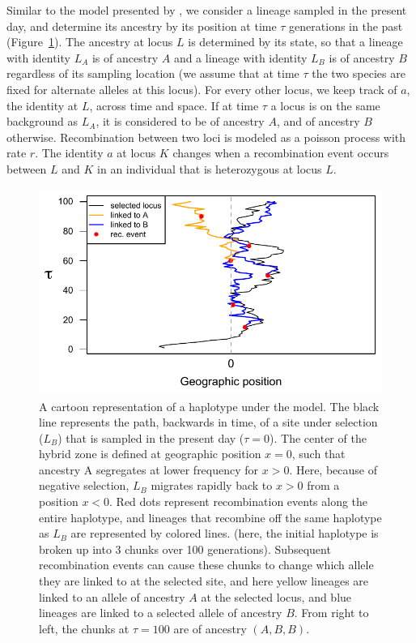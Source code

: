 \documentclass[12pt]{article}
\begin{document}
Similar to the model presented by \cite{Sedghifar2015}, we consider a lineage sampled in the present day, and determine its ancestry by its position at time $\tau$ generations in the past (Figure~\ref{Fig:schematic}). 
The ancestry at locus $L$ is determined by its state, so that a lineage with identity $L_A$ is of ancestry $A$ and a lineage with identity $L_B$ is of ancestry $B$ regardless of its sampling location (we assume that at time $\tau$ the two species are fixed for alternate alleles at this locus). 
For every other locus, we keep track of $a$, the identity at $L$, across time and space. If at time $\tau$ a locus is on the same background as $L_A$, it is considered to be of ancestry $A$, and of ancestry $B$ otherwise. Recombination between two loci is modeled as a poisson process with rate $r$. The identity $a$ at locus $K$ changes when a recombination event occurs between $L$ and $K$ in an individual that is heterozygous at locus $L$. 

\begin{figure}
\includegraphics{figs/BM_schematic}
\caption{A cartoon representation of a haplotype under the model. The black line represents the path, backwards in time, of a site under selection ($L_B$) that is sampled in the present day ($\tau=0$). The center of the hybrid zone is defined at geographic position $x=0$, such that ancestry A segregates at lower frequency for $x>0$. Here, because of negative selection, $L_B$ migrates rapidly back to $x>0$ from a position $x<0$. Red dots represent recombination events along the entire haplotype, and lineages that recombine off the same haplotype as $L_B$ are represented by colored lines. (here, the initial haplotype is broken up into 3 chunks over 100 generations). Subsequent recombination events can cause these chunks to change which allele they are linked to at the selected site, and here yellow lineages are linked to an allele of ancestry $A$ at the selected locus, and blue lineages are linked to a selected allele of ancestry $B$. From right to left, the chunks at $\tau=100$ are of ancestry $(A, B, B)$. }\label{Fig:schematic}
\end{figure}
\end{document}
